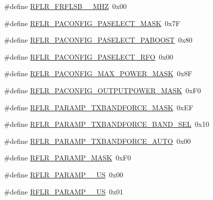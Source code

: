 \begin{DoxyCompactItemize}
\item 
\#define \mbox{\hyperlink{sx1276_regs-_lo_ra_8h_a9fbeb4068d680304497804b2e3b01cc1}{R\+F\+L\+R\+\_\+\+F\+R\+F\+L\+S\+B\+\_\+\_\+\+M\+HZ}}~0x00
\item 
\#define \mbox{\hyperlink{sx1276_regs-_lo_ra_8h_a98fc674afce865acf9efb9a1c2ab39a3}{R\+F\+L\+R\+\_\+\+P\+A\+C\+O\+N\+F\+I\+G\+\_\+\+P\+A\+S\+E\+L\+E\+C\+T\+\_\+\+M\+A\+SK}}~0x7F
\item 
\#define \mbox{\hyperlink{sx1276_regs-_lo_ra_8h_a268b1d9d7fa806038150cabff6dee9a7}{R\+F\+L\+R\+\_\+\+P\+A\+C\+O\+N\+F\+I\+G\+\_\+\+P\+A\+S\+E\+L\+E\+C\+T\+\_\+\+P\+A\+B\+O\+O\+ST}}~0x80
\item 
\#define \mbox{\hyperlink{sx1276_regs-_lo_ra_8h_a584857e70a2e6fddfb11bc51775b35a6}{R\+F\+L\+R\+\_\+\+P\+A\+C\+O\+N\+F\+I\+G\+\_\+\+P\+A\+S\+E\+L\+E\+C\+T\+\_\+\+R\+FO}}~0x00
\item 
\#define \mbox{\hyperlink{sx1276_regs-_lo_ra_8h_a2045361d9d317c305aed6e405420ab81}{R\+F\+L\+R\+\_\+\+P\+A\+C\+O\+N\+F\+I\+G\+\_\+\+M\+A\+X\+\_\+\+P\+O\+W\+E\+R\+\_\+\+M\+A\+SK}}~0x8F
\item 
\#define \mbox{\hyperlink{sx1276_regs-_lo_ra_8h_a1d4448a184c398c43e06bfad5102730f}{R\+F\+L\+R\+\_\+\+P\+A\+C\+O\+N\+F\+I\+G\+\_\+\+O\+U\+T\+P\+U\+T\+P\+O\+W\+E\+R\+\_\+\+M\+A\+SK}}~0x\+F0
\item 
\#define \mbox{\hyperlink{sx1276_regs-_lo_ra_8h_a9112c35a5e33d45453157d1a04591294}{R\+F\+L\+R\+\_\+\+P\+A\+R\+A\+M\+P\+\_\+\+T\+X\+B\+A\+N\+D\+F\+O\+R\+C\+E\+\_\+\+M\+A\+SK}}~0x\+EF
\item 
\#define \mbox{\hyperlink{sx1276_regs-_lo_ra_8h_ad45572b9fe781c4e783cc7aef19b1406}{R\+F\+L\+R\+\_\+\+P\+A\+R\+A\+M\+P\+\_\+\+T\+X\+B\+A\+N\+D\+F\+O\+R\+C\+E\+\_\+\+B\+A\+N\+D\+\_\+\+S\+EL}}~0x10
\item 
\#define \mbox{\hyperlink{sx1276_regs-_lo_ra_8h_aeaf1429172c5196bcaa7f5d3079113d1}{R\+F\+L\+R\+\_\+\+P\+A\+R\+A\+M\+P\+\_\+\+T\+X\+B\+A\+N\+D\+F\+O\+R\+C\+E\+\_\+\+A\+U\+TO}}~0x00
\item 
\#define \mbox{\hyperlink{sx1276_regs-_lo_ra_8h_a8e2df5205bbee456190800ae3e6c5b48}{R\+F\+L\+R\+\_\+\+P\+A\+R\+A\+M\+P\+\_\+\+M\+A\+SK}}~0x\+F0
\item 
\#define \mbox{\hyperlink{sx1276_regs-_lo_ra_8h_a17650ac6f6503f25d99fc36183d339fb}{R\+F\+L\+R\+\_\+\+P\+A\+R\+A\+M\+P\+\_\+\_\+\+US}}~0x00
\item 
\#define \mbox{\hyperlink{sx1276_regs-_lo_ra_8h_a54e4bb780307ff67f9319190a061ed65}{R\+F\+L\+R\+\_\+\+P\+A\+R\+A\+M\+P\+\_\+\_\+\+US}}~0x01

\end{DoxyCompactItemize}
